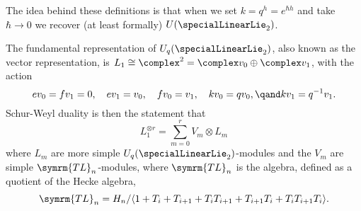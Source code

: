 \documentclass[fleqn]{NotesClass}
\newcommand{\isomorphic}{\cong}
\newcommand{\temperleyLieb}{\symrm{TL}}
\begin{document}
    The idea behind these definitions is that when we set \(k = q^{h} = e^{\hbar h}\) and take \(\hbar \to 0\) we recover (at least formally) \(U(\specialLinearLie_2)\).
    
    The fundamental representation of \(U_q(\specialLinearLie_2)\), also known as the vector representation, is \(L_1 \isomorphic \complex^2 = \complex v_0 \oplus \complex v_1\), with the action
    \begin{equation}
        e v_0 = fv_1 = 0, \quad ev_1 = v_0, \quad f v_0 = v_1, \quad kv_0 = qv_0, \qand kv_1 = q^{-1}v_1.
    \end{equation}
    Schur-Weyl duality is then the statement that
    \begin{equation}
        L_1^{\otimes r} = \sum_{m = 0}^r V_m \otimes L_m
    \end{equation}
    where \(L_m\) are more simple \(U_q(\specialLinearLie_2)\)-modules and the \(V_m\) are simple \(\temperleyLieb_n\)-modules, where \(\temperleyLieb_n\) is the  algebra, defined as a quotient of the Hecke algebra,
    \begin{equation}
        \temperleyLieb_n = H_n / \langle 1 + T_i + T_{i+1} + T_i T_{i+1} + T_{i+1} T_i + T_i T_{i+1} T_i \rangle.
    \end{equation}
    
\end{document}
